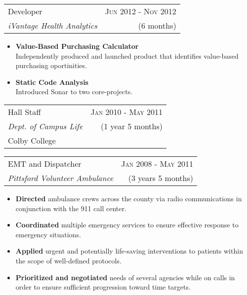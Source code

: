 \documentclass[10pt]{article} %
\begin{document}
{\begin{minipage}[t]{0.5\textwidth}

\begin{tabularx}{\linewidth}{ X r }
  {\large Developer } & {\textsc{Jun 2012 - Nov 2012}} \\
  {\small\textit{iVantage Health Analytics}} & {\small{(6 months)}}
\end{tabularx}

\begin{itemize}
  \item \textbf{Value-Based Purchasing Calculator} \\
    Independently produced and launched product that identifies value-based purchasing oportinities.
  \item \textbf{Static Code Analysis} \\
    Introduced Sonar to two core-projects.
\end{itemize}


\begin{tabularx}{\linewidth}{ X r }
  {\large Hall Staff } & {\textsc{Jan 2010 - May 2011}} \\
  {\small{\textit{Dept. of Campus Life}}} & {\small{(1 year 5 months)}} \\
  {\small{Colby College}} 
\end{tabularx}

\vspace{10pt}


\begin{tabularx}{\linewidth}{ X r }
  {\large EMT and Dispatcher } & {\textsc{Jan 2008 - May 2011}} \\
  {\small\textit{Pittsford Volunteer Ambulance}} & {\small{(3 years 5 months)}}
\end{tabularx}
\begin{itemize}
  \item \textbf{Directed} ambulance crews across the county via radio communications in conjunction with the 911 call center.
  \item \textbf{Coordinated} multiple emergency services to ensure effective response to emergency situations.
  \item \textbf{Applied} urgent and potentially life-saving interventions to patients within the scope of well-defined protocols.
  \item \textbf{Prioritized and negotiated} needs of several agencies while on calls in order to ensure sufficient progression toward time targets.
\end{itemize}


\end{minipage}}
\end{document}
